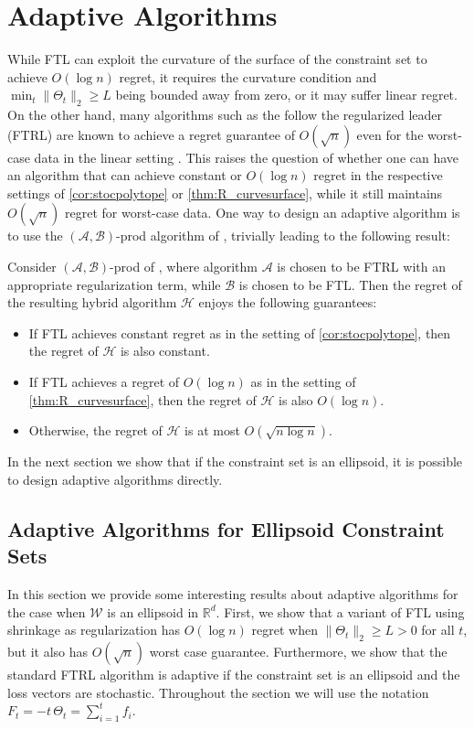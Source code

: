 \documentclass[english]{article}
\newcommand{\todoa}[2][]{\todo[color=Purple!20,size=\tiny,#1]{A: #2}}
\newcommand{\cA}{\mathcal{A}}
\newcommand{\cB}{\mathcal{B}}
\newcommand{\cW}{\mathcal{W}}
\newcommand{\cH}{\mathcal{H}}
\newcommand{\R}{\mathbb{R}}
\begin{document}
\section{Adaptive Algorithms} 
While FTL can exploit the curvature of the surface of the constraint set to achieve $O(\log n)$ regret, it requires the curvature condition and $\min_t \|\Theta_t\|_2 \ge L$ being bounded away from zero, or
it may suffer linear regret.
On the other hand, many algorithms such as the follow the regularized leader (FTRL) are known to achieve a regret guarantee of $O(\sqrt{n})$ even for the worst-case data in the linear setting \citep[see, e.g.,][]{SS12:Book}.
This raises the question of whether one can have an algorithm that can 
achieve constant or $O(\log n)$ regret in the respective settings of  \cref{cor:stocpolytope} or \cref{thm:R_curvesurface},
while it still maintains $O(\sqrt{n})$ regret for worst-case data. 
One way to design an adaptive algorithm is to use the $(\cA, \cB)$-prod algorithm of \citet{sani2014exploiting}, trivially leading to the following result:
\begin{proposition}
Consider $(\cA,\cB)$-prod of \citet{sani2014exploiting}, where algorithm \todoa{Do we need to write out $(\cA,\cB)$-prod?}
 $\cA$ is chosen to be FTRL with an appropriate regularization term, 
 while $\cB$ is chosen to be FTL. 
Then the regret of the resulting hybrid algorithm $\cH$ enjoys the following guarantees:
\begin{itemize}\setlength{\itemsep}{0pt}
\item If FTL achieves constant regret as in the setting of \cref{cor:stocpolytope}, then the regret of $\cH$ is also constant.
\item If FTL achieves a regret of $O(\log n)$ as in the setting of \cref{thm:R_curvesurface}, then the regret of $\cH$ is also $O(\log n)$.
\item Otherwise, the regret of $\cH$ is at most $O(\sqrt{n\log n})$.
\end{itemize}
\end{proposition} 

In the next section we show that if the constraint set is an ellipsoid, it is possible to design adaptive algorithms directly.

\subsection{Adaptive Algorithms for Ellipsoid Constraint Sets}

In this section we provide some interesting results about adaptive algorithms for the case when $\cW$ is an ellipsoid in $\R^d$. First, we show that a variant of FTL using shrinkage as regularization has $O(\log n)$ regret when $\|\Theta_t\|_2 \ge L>0$ for all $t$, but it also has $O(\sqrt{n})$ worst case guarantee. Furthermore, we show that the standard FTRL algorithm is adaptive if the constraint set is an ellipsoid and the loss vectors are stochastic.
Throughout the section we will use the notation $F_t=-t\,\Theta_{t}=\sum_{i=1}^{t} f_i$.
\end{document}
